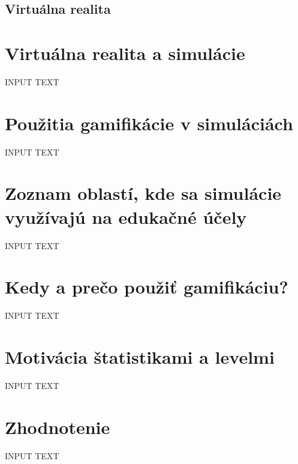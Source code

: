 \documentclass[10pt,slovak,a4paper]{article}
\begin{document}
\subsection{Virtuálna realita} \label{Gamification:virtual_reality}



\section{Virtuálna realita a simulácie} \label{Simulations}

INPUT TEXT 

\section{Použitia gamifikácie v simuláciách} \label{Uses}

INPUT TEXT

\section{Zoznam oblastí, kde sa simulácie využívajú na edukačné účely} \label{List}

INPUT TEXT

\section{Kedy a prečo použiť gamifikáciu?} \label{Reason}

INPUT TEXT

\section{Motivácia štatistikami a levelmi} \label{Motivation}

INPUT TEXT

\section{Zhodnotenie} \label{Evaluation}

INPUT TEXT

%
%
\end{document}
